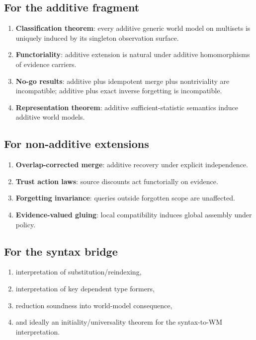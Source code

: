 \documentclass[11pt]{article}
\begin{document}
\subsection{For the additive fragment}
\begin{enumerate}
  \item \textbf{Classification theorem}: every additive generic world model on
        multisets is uniquely induced by its singleton observation surface.
  \item \textbf{Functoriality}: additive extension is natural under additive
        homomorphisms of evidence carriers.
  \item \textbf{No-go results}: additive plus idempotent merge plus nontriviality
        are incompatible; additive plus exact inverse forgetting is incompatible.
  \item \textbf{Representation theorem}: additive sufficient-statistic semantics
        induce additive world models.
\end{enumerate}

\subsection{For non-additive extensions}
\begin{enumerate}
  \item \textbf{Overlap-corrected merge}: additive recovery under explicit
        independence.
  \item \textbf{Trust action laws}: source discounts act functorially on evidence.
  \item \textbf{Forgetting invariance}: queries outside forgotten scope are
        unaffected.
  \item \textbf{Evidence-valued gluing}: local compatibility induces global
        assembly under policy.
\end{enumerate}

\subsection{For the syntax bridge}
\begin{enumerate}
  \item interpretation of substitution/reindexing,
  \item interpretation of key dependent type formers,
  \item reduction soundness into world-model consequence,
  \item and ideally an initiality/universality theorem for the syntax-to-WM
        interpretation.
\end{enumerate}
\end{document}
